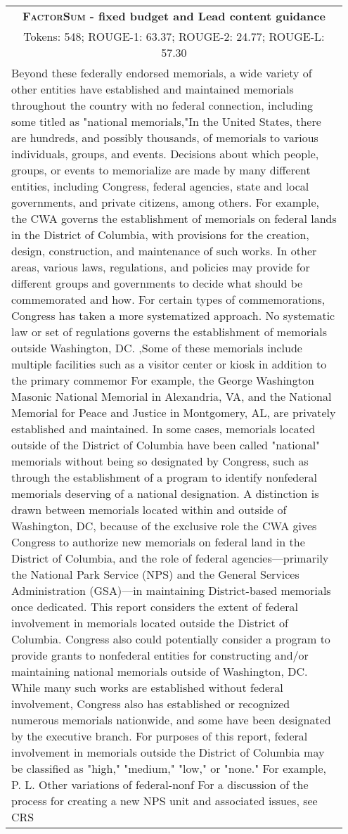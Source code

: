 \documentclass[11pt,table]{article}
\newcommand{\modelname}{FactorSum}
\begin{document}
\begin{table*}[ht]
  \centering
  \begin{tabular}{p{0.95\linewidth}}
    \toprule
    \multicolumn{1}{c}{\textbf{\textsc{\modelname} - fixed budget and Lead content guidance}} \\
    \multicolumn{1}{c}{Tokens: 548; ROUGE-1: 63.37; ROUGE-2: 24.77; ROUGE-L: 57.30} \\
    \midrule
    Beyond these federally endorsed memorials, a wide variety of other entities have established and maintained memorials throughout the country with no federal connection, including some titled as "national memorials,"In the United States, there are hundreds, and possibly thousands, of memorials to various individuals, groups, and events. Decisions about which people, groups, or events to memorialize are made by many different entities, including Congress, federal agencies, state and local governments, and private citizens, among others. For example, the CWA governs the establishment of memorials on federal lands in the District of Columbia, with provisions for the creation, design, construction, and maintenance of such works. In other areas, various laws, regulations, and policies may provide for different groups and governments to decide what should be commemorated and how. For certain types of commemorations, Congress has taken a more systematized approach. No systematic law or set of regulations governs the establishment of memorials outside Washington, DC. ,Some of these memorials include multiple facilities such as a visitor center or kiosk in addition to the primary commemor For example, the George Washington Masonic National Memorial in Alexandria, VA, and the National Memorial for Peace and Justice in Montgomery, AL, are privately established and maintained. In some cases, memorials located outside of the District of Columbia have been called "national" memorials without being so designated by Congress, such as through the establishment of a program to identify nonfederal memorials deserving of a national designation. A distinction is drawn between memorials located within and outside of Washington, DC, because of the exclusive role the CWA gives Congress to authorize new memorials on federal land in the District of Columbia, and the role of federal agencies—primarily the National Park Service (NPS) and the General Services Administration (GSA)—in maintaining District-based memorials once dedicated. This report considers the extent of federal involvement in memorials located outside the District of Columbia. Congress also could potentially consider a program to provide grants to nonfederal entities for constructing and/or maintaining national memorials outside of Washington, DC. While many such works are established without federal involvement, Congress also has established or recognized numerous memorials nationwide, and some have been designated by the executive branch. For purposes of this report, federal involvement in memorials outside the District of Columbia may be classified as "high," "medium," "low," or "none." For example, P. L. Other variations of federal-nonf For a discussion of the process for creating a new NPS unit and associated issues, see CRS 
\end{tabular}
\end{table*}
\end{document}
